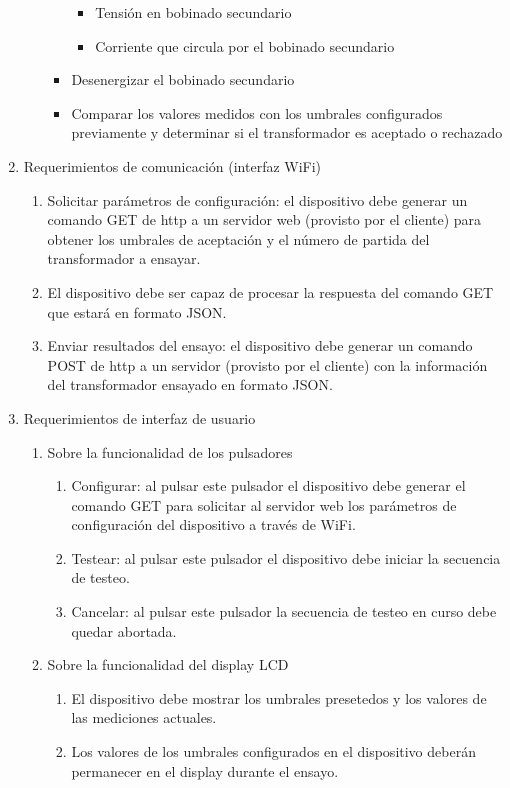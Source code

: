 \documentclass[11pt]{charter}
\begin{document}
\begin{enumerate}
\begin{enumerate}
\begin{itemize}
\begin{itemize}
			\item Tensión en bobinado secundario
			\item Corriente que circula por el bobinado secundario
			\end{itemize}
		\item Desenergizar el bobinado secundario
		\item Comparar los valores medidos con los umbrales configurados previamente y determinar si el transformador es aceptado o rechazado
		\end{itemize}
	\end{enumerate}	
\item Requerimientos de comunicación (interfaz WiFi)
	\begin{enumerate}
	\item Solicitar parámetros de configuración: el dispositivo debe generar un comando GET de http a un servidor web (provisto por el cliente) para obtener los umbrales de aceptación y el número de partida del transformador a ensayar.
	\item El dispositivo debe ser capaz de procesar la respuesta del comando GET que estará en formato JSON.
	\item Enviar resultados del ensayo: el dispositivo debe generar un comando POST de http a un servidor (provisto por el cliente) con la información del transformador ensayado en formato JSON.
	\end{enumerate}
\item Requerimientos de interfaz de usuario
	\begin{enumerate}
	\item Sobre la funcionalidad de los pulsadores
		\begin{enumerate}
		\item Configurar: al pulsar este pulsador el dispositivo debe generar el comando GET para solicitar al servidor web los parámetros de configuración del dispositivo a través de WiFi.
		\item Testear: al pulsar este pulsador el dispositivo debe iniciar la secuencia de testeo.
		\item Cancelar: al pulsar este pulsador la secuencia de testeo en curso debe quedar abortada.
		\end{enumerate}
	\item Sobre la funcionalidad del display LCD
		\begin{enumerate}
		\item El dispositivo debe mostrar los umbrales presetedos y los valores de las mediciones actuales.
		\item Los valores de los umbrales configurados en el dispositivo deberán permanecer en el display  durante el ensayo.

\end{enumerate}
\end{enumerate}
\end{enumerate}
\end{document}
